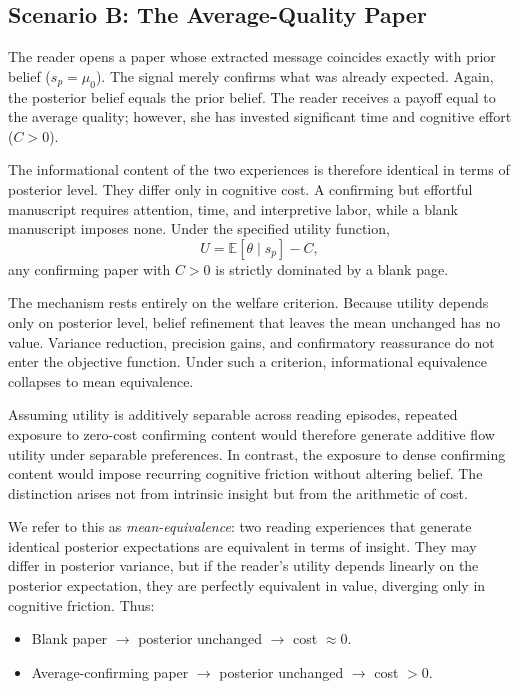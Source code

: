 \documentclass[AER]{AEA}
\begin{document}
\subsection{Scenario B: The Average-Quality Paper}
The reader opens a paper whose extracted message coincides exactly with prior belief ($s_p = \mu_0$). The signal merely confirms what was already expected. Again, the posterior belief equals the prior belief. The reader receives a payoff equal to the average quality; however, she has invested significant time and cognitive effort ($C > 0$).

The informational content of the two experiences is therefore identical in terms of posterior level. They differ only in cognitive cost. A confirming but effortful manuscript requires attention, time, and interpretive labor, while a blank manuscript imposes none. Under the specified utility function,
\[
U = \mathbb{E}[\theta \mid s_p] - C,
\]
any confirming paper with $C>0$ is strictly dominated by a blank page.

The mechanism rests entirely on the welfare criterion. Because utility depends only on posterior level, belief refinement that leaves the mean unchanged has no value. Variance reduction, precision gains, and confirmatory reassurance do not enter the objective function. Under such a criterion, informational equivalence collapses to mean equivalence. 

Assuming utility is additively separable across reading episodes, repeated exposure to zero-cost confirming content would therefore generate additive flow utility under separable preferences. In contrast, the exposure to dense confirming content would impose recurring cognitive friction without altering belief. The distinction arises not from intrinsic insight but from the arithmetic of cost. 

We refer to this as \emph{mean-equivalence}: two reading experiences that generate identical posterior expectations are equivalent in terms of insight. They may differ in posterior variance, but if the reader’s utility depends linearly on the posterior expectation, they are perfectly equivalent in value, diverging only in cognitive friction. Thus:

\begin{itemize}
    \item Blank paper $\rightarrow$ posterior unchanged $\rightarrow$ cost $\approx 0$.
    \item Average-confirming paper $\rightarrow$ posterior unchanged $\rightarrow$ cost $>0$.
\end{itemize}
\end{document}

